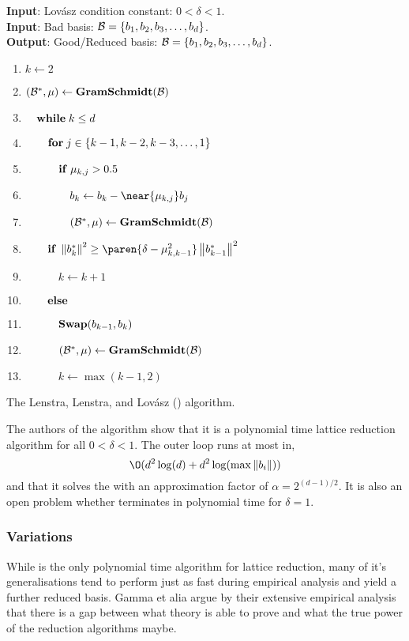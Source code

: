 \documentclass{homework}
\begin{document}
\begin{algorithm}
  \begin{flushleft}
    \noindent\textbf{Input}: Lov\'asz condition constant: $0 < \delta < 1$. \\
    \noindent\textbf{Input}: Bad basis: $\mathcal{B} = \{b_1, b_2, b_3, \dots, b_d\}$. \\
    \noindent\textbf{Output}: Good/Reduced basis:
    $\mathcal{B} = \{b_1, b_2, b_3, \dots, b_d\}$.
  \end{flushleft}
  \begin{enumerate}[label=\arabic*:]
    \item $k \leftarrow 2$
    \item $(\mathcal{B}^*, \mu) \leftarrow \mathbf{GramSchmidt}(\mathcal{B})$
    \item $\quad \mathbf{while\;} k \leq d$
    \item $\quad\quad \mathbf{for\;} j \in \{k - 1, k - 2, k - 3, \dots, 1\}$
    \item $\quad\quad\quad \mathbf{if\;} \mu_{k, j} > 0.5$
    \item $\quad\quad\quad\quad b_k \leftarrow b_k - \near{\mu_{k, j}}b_j$
    \item $\quad\quad\quad\quad (\mathcal{B}^*, \mu) \leftarrow \mathbf{GramSchmidt}(\mathcal{B})$
    \item $\quad\quad \IF \norm{b_k^*}^2 \geq
            \paren{\delta - \mu_{k, k-1}^2}\norm{b_{k-1}^*}^2$
    \item $\quad\quad\quad k \leftarrow k + 1$
    \item $\quad\quad \mathbf{else\;}$
    \item $\quad\quad\quad \mathbf{Swap}(b_{k-1}, b_k)$
    \item $\quad\quad\quad (\mathcal{B}^*, \mu) \leftarrow \mathbf{GramSchmidt}(\mathcal{B})$
    \item $\quad\quad\quad k \leftarrow \max(k - 1, 2)$
  \end{enumerate}
  \caption{The Lenstra, Lenstra, and Lov\'asz (\LLL) algorithm.}
  \label{lllalg}
\end{algorithm}

The authors \cite{lenstra1982factoring} of the \LLL{} algorithm show
that it is a polynomial time lattice reduction algorithm for all $0 <
\delta < 1$. The outer loop runs at most in,
\[
  \O(d^2\log(d) + d^2\log(\max\norm{b_i}))
\]
and that it solves the \appr\SVP{} with an approximation factor of
$\alpha = 2^{(d-1)/2}$. It is also an open problem whether \LLL{}
terminates in polynomial time for $\delta = 1.$

\subsubsection{\LLL{} Variations} While \LLL{} is the only polynomial
time algorithm for lattice reduction, many of it's generalisations
tend to perform just as fast during empirical analysis and yield a
further reduced basis. Gamma et alia argue by their extensive
empirical analysis \cite{gama2008predicting} that there is a gap
between what theory is able to prove and what the true power of the
reduction algorithms maybe.
\end{document}
